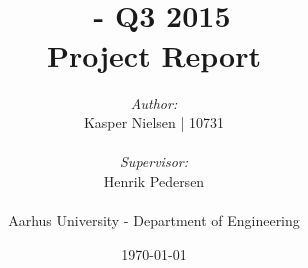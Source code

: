\documentclass[11pt]{article}
\title{
	{\Huge \projectTitle \\}
	\bigskip
	\courseCode\ - Q3 2015 \\
	\medskip
	Project Report
	}
\author{
	\emph{Author:}\\
	Kasper Nielsen | 10731\\
	\-\\
	\emph{Supervisor:}\\
	Henrik Pedersen\\
	\-\\
	Aarhus University - Department of Engineering}
\date{\today} %
\begin{document}
\maketitle	%

\listoffixmes %

\newpage			%
\tableofcontents	%

\newpage


\newpage
	

\newpage
	

\newpage


\newpage
 

\newpage
% 



\newpage
\appendix


% 
\end{document}
